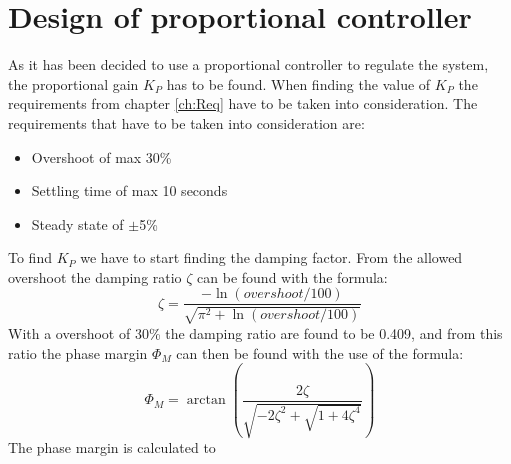 \section{Design of proportional controller}\label{sec:design_controller}
As it has been decided to use a proportional controller to regulate the system, the proportional gain $K_P$ has to be found. 
When finding the value of $K_P$ the requirements from chapter \ref{ch:Req} have to be taken into consideration. 
The requirements that have to be taken into consideration are:
\begin{itemize}
    \item Overshoot of max 30\%
    \item Settling time of  max 10 seconds
    \item Steady state of $\pm$5\%
\end{itemize}
To find $K_P$ we have to start finding the damping factor. From the allowed overshoot the damping ratio $\zeta$ can be found with the formula:
\begin{equation}
    \zeta = \frac{-\ln(overshoot/100)}{\sqrt{\pi^2+\ln(overshoot/100)}}
\end{equation}
With a overshoot of 30\% the damping ratio are found to be 0.409, and from this ratio the phase margin $\Phi_M$ can then be found with the use of the formula:
\begin{equation}
    \Phi_M = \arctan\left(\frac{2\zeta}{\sqrt{-2\zeta^2+\sqrt{1+4\zeta^4}}}\right)
\end{equation}
The phase margin is calculated to %